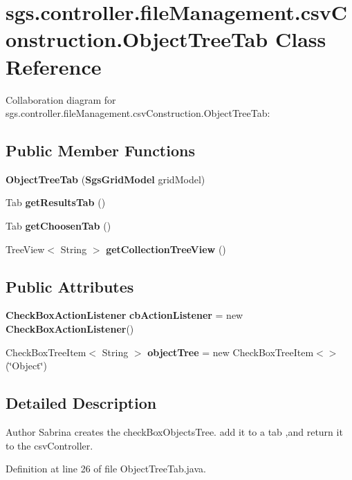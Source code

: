\section{sgs.\-controller.\-file\-Management.\-csv\-Construction.\-Object\-Tree\-Tab Class Reference}
\label{classsgs_1_1controller_1_1file_management_1_1csv_construction_1_1_object_tree_tab}


Collaboration diagram for sgs.\-controller.\-file\-Management.\-csv\-Construction.\-Object\-Tree\-Tab\-:
\subsection*{Public Member Functions}
\begin{DoxyCompactItemize}
\item 
{\bf Object\-Tree\-Tab} ({\bf Sgs\-Grid\-Model} grid\-Model)
\item 
Tab {\bf get\-Results\-Tab} ()
\item 
Tab {\bf get\-Choosen\-Tab} ()
\item 
Tree\-View$<$ String $>$ {\bf get\-Collection\-Tree\-View} ()
\end{DoxyCompactItemize}
\subsection*{Public Attributes}
\begin{DoxyCompactItemize}
\item 
{\bf Check\-Box\-Action\-Listener} {\bf cb\-Action\-Listener} = new {\bf Check\-Box\-Action\-Listener}()
\item 
Check\-Box\-Tree\-Item$<$ String $>$ {\bf object\-Tree} = new Check\-Box\-Tree\-Item$<$$>$(\char`\"{}Object\char`\"{})
\end{DoxyCompactItemize}


\subsection{Detailed Description}
\begin{DoxyAuthor}{Author}
Sabrina creates the check\-Box\-Objects\-Tree. add it to a tab ,and return it to the csv\-Controller. 
\end{DoxyAuthor}


Definition at line 26 of file Object\-Tree\-Tab.\-java.



